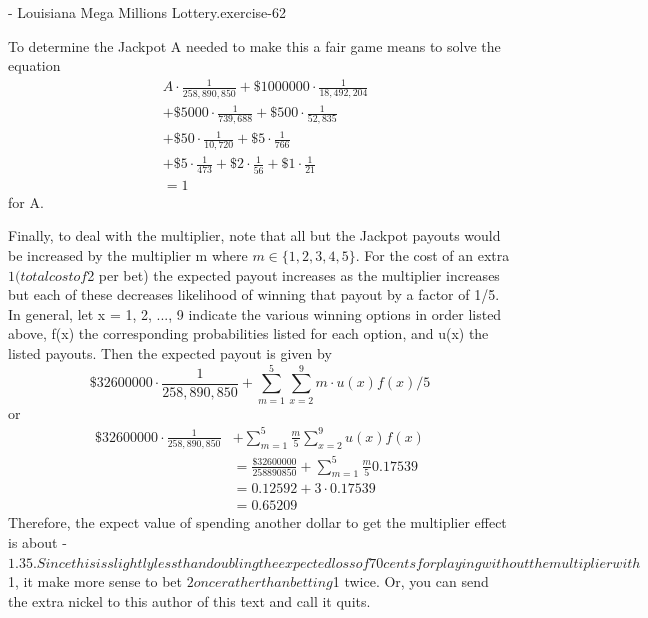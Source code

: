 \documentclass[10pt,]{book}
\numberwithin{equation}{section}
\begin{document}
\begin{inlineexercise}{- Louisiana Mega Millions Lottery.}{exercise-62}
\par
\hypertarget{p-889}{}%
To determine the Jackpot A needed to make this a fair game means to solve the equation%
\begin{align*}
& A \cdot \frac{1}{258,890,850} + \$1000000 \cdot \frac{1}{18,492,204} \\
& + \$5000 \cdot \frac{1}{739,688} + \$500 \cdot \frac{1}{52,835}\\
& + \$50 \cdot \frac{1}{10,720} + \$5 \cdot \frac{1}{766} \\
& + \$5 \cdot \frac{1}{473} + \$2 \cdot \frac{1}{56} + \$1 \cdot \frac{1}{21}\\
& = 1
\end{align*}
for A.%
\par
\hypertarget{p-890}{}%
Finally, to deal with the multiplier, note that all but the Jackpot payouts would be increased by the multiplier m where \(m \in \{1,2,3,4,5\}\).  For the cost of an extra $1 (total cost of $2 per bet) the expected payout increases as the multiplier increases but each of these decreases likelihood of winning that payout by a factor of 1/5.  In general, let x = 1, 2, ..., 9 indicate the various winning options in order listed above, f(x) the corresponding probabilities listed for each option, and  u(x) the listed payouts. Then the expected payout is given by%
\begin{equation*}
\$32600000 \cdot \frac{1}{258,890,850} + \sum_{m=1}^5
\sum_{x=2}^9 m \cdot u(x) f(x)/5 
\end{equation*}
or%
\begin{align*}
\$32600000 \cdot \frac{1}{258,890,850} & + \sum_{m=1}^5 \frac{m}{5} \sum_{x=2}^9 u(x) f(x) \\
& = \frac{\$32600000}{258890850} + \sum_{m=1}^5 \frac{m}{5} 0.17539\\
& = 0.12592 + 3 \cdot 0.17539\\
& = 0.65209
\end{align*}
Therefore, the expect value of spending another dollar to get the multiplier effect is about -$1.35.  Since this is slightly less than doubling the expected loss of 70 cents for playing without the multiplier with $1, it make more sense to bet $2 once rather than betting $1 twice.  Or, you can send the extra nickel to this author of this text and call it quits.%
\end{inlineexercise}
%
%
%
\typeout{************************************************}
\typeout{************************************************}
%
\end{document}
